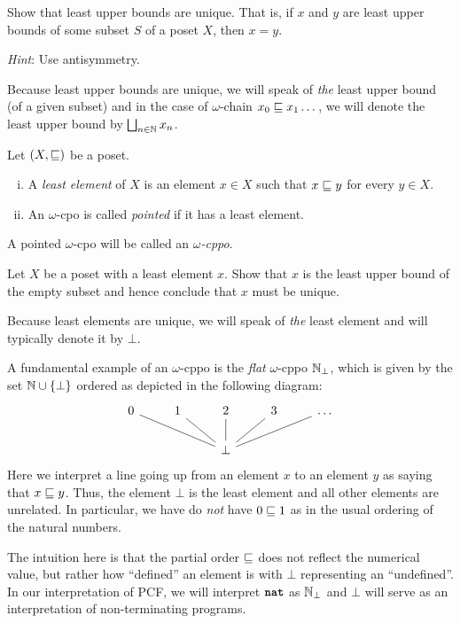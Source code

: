 \begin{exercise}\label{exer:least-upper-bounds-are-unique}
  Show that least upper bounds are unique. That is, if \(x\) and \(y\) are least
  upper bounds of some subset \(S\) of a poset \(X\), then \(x = y\).

  \emph{Hint}: Use antisymmetry.
\end{exercise}

Because least upper bounds are unique, we will speak of \emph{the} least upper
bound (of a given subset) and in the case of \(\omega\)-chain
\(x_0 \sqsubseteq x_1 \dots\), we will denote the least upper bound by
\(\bigsqcup_{n \in \mathbb N}x_n\).

\begin{definition}
  Let \((X,{\sqsubseteq})\) be a poset.
  \begin{enumerate}[(i)]
  \item A \emph{least element} of \(X\) is an element \(x \in X\) such that
    \(x \sqsubseteq y\) for every \(y \in X\).
  \item An \(\omega\)-cpo is called \emph{pointed} if it has a least element.
  \end{enumerate}
  A pointed \(\omega\)-cpo will be called an \emph{\(\omega\)-cppo}.
\end{definition}

\begin{exercise}\label{exer:least-element-is-unique}
  Let \(X\) be a poset with a least element \(x\). Show that \(x\) is the least
  upper bound of the empty subset and hence conclude that \(x\) must be unique.
\end{exercise}

Because least elements are unique, we will speak of \emph{the} least element and
will typically denote it by \(\bot\).

\begin{example}[\(\Nat_\bot\)]\label{exam:N_bot}
  A fundamental example of an \(\omega\)-cppo is the \emph{flat} \(\omega\)-cppo
  \(\Nat_\bot\), which is given by the set \(\mathbb N \cup \{\bot\}\) ordered as
  depicted in the following diagram:
  \[
    \begin{tikzcd}
      0 & 1 & 2 & 3 & \ldots \\
      & & \bot \ar[ull,no head] \ar[ul,no head] \ar[u,no head] \ar[ur, no head]
      \ar[urr, no head]
    \end{tikzcd}
  \]
  Here we interpret a line going up from an element \(x\) to an element \(y\) as
  saying that \(x \sqsubseteq y\).
  Thus, the element \(\bot\) is the least element and all other elements are
  unrelated.
  In particular, we have do \emph{not} have \(0 \sqsubseteq 1\) as in the usual
  ordering of the natural numbers.

  The intuition here is that the partial order \({\sqsubseteq}\) does not reflect the
  numerical value, but rather how ``defined'' an element is with \(\bot\)
  representing an ``undefined''.
  In our interpretation of PCF, we will interpret \(\texttt{\textbf{nat}}\) as \(\Nat_\bot\)
  and \(\bot\) will serve as an interpretation of non-terminating programs.
\end{example}


